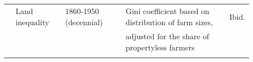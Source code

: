 \begin{tabular}{@{}l|llll@{}}
			      & Land inequality                                               & 1860-1950 (decennial)                        & Gini coefficient based on distribution of farm sizes,     & Ibid.   \\
  				&                  &          &  adjusted for the share of propertyless farmers           &  	\\   
                                   &                                                             &                            &               &            \\        
                                   

\end{tabular}
